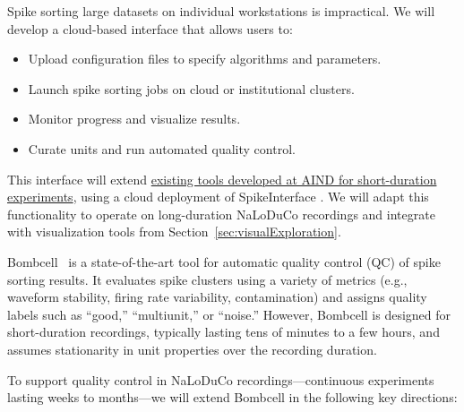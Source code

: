 \label{sec:offlineMethodsCloud}

Spike sorting large datasets on individual workstations is impractical. We will develop a cloud-based interface that allows users to:

\begin{itemize}
    \item Upload configuration files to specify algorithms and parameters.
    \item Launch spike sorting jobs on cloud or institutional clusters.
    \item Monitor progress and visualize results.
    \item Curate units and run automated quality control.
\end{itemize}

This interface will extend
\href{https://www.youtube.com/watch?v=F652nwcdYSE&list=PLQVnU1OJzOn_mFlUL8aWQym4HfVvhlrGE&index=28&t=20s}{existing
tools developed at AIND for short-duration experiments}, using a cloud
deployment of SpikeInterface \citep{buccinoEtAl20}. We will adapt this
functionality to operate on long-duration NaLoDuCo recordings and integrate
with visualization tools from Section~\ref{sec:visualExploration}.

\label{sec:offlineQC}



Bombcell~\citep{fabreEtAl23} is a state-of-the-art tool for automatic quality control (QC) of spike sorting results. It evaluates spike clusters using a variety of metrics (e.g., waveform stability, firing rate variability, contamination) and assigns quality labels such as ``good,'' ``multiunit,'' or ``noise.'' However, Bombcell is designed for short-duration recordings, typically lasting tens of minutes to a few hours, and assumes stationarity in unit properties over the recording duration.

To support quality control in NaLoDuCo recordings—continuous experiments lasting weeks to months—we will extend Bombcell in the following key directions:


